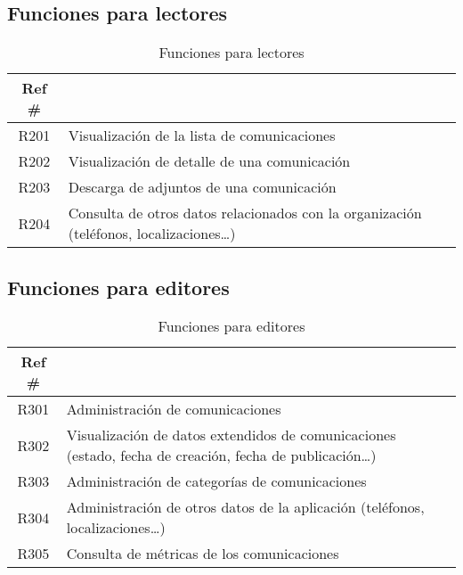 \subsection{Funciones para lectores}
\begin{table}[ht]
    \centering
    \begin{tabularx}{\textwidth}{|cX|}
    \rowcolor[HTML]{9B9B9B} 
    {\color[HTML]{FFFFFF} Ref \#} &
      \multicolumn{1}{l}{\cellcolor[HTML]{9B9B9B}{\color[HTML]{FFFFFF} Función}} \\ \hline
    R201\label{R201} & Visualización de la lista de comunicaciones \\
    R202\label{R202} & Visualización de detalle de una comunicación \\
    R203\label{R203} & Descarga de adjuntos de una comunicación \\ 
    R204\label{R204} & Consulta de otros datos relacionados con la organización (teléfonos, localizaciones\dots) \\
    \hline
    \end{tabularx}
    \caption{Funciones para lectores}
    \label{cuadro:funciones-lectores }
\end{table}


\subsection{Funciones para editores}

\begin{table}[ht]
    \centering
    \begin{tabularx}{\textwidth}{|cX|}
    \rowcolor[HTML]{9B9B9B} 
    {\color[HTML]{FFFFFF} Ref \#} &
      \multicolumn{1}{l}{\cellcolor[HTML]{9B9B9B}{\color[HTML]{FFFFFF} Función}} \\ \hline
    R301\label{R301} & Administración de comunicaciones \\
    R302\label{R302} & Visualización de datos extendidos de comunicaciones (estado, fecha de creación, fecha de publicación\dots) \\
    R303\label{R303} & Administración de categorías de comunicaciones \\
    R304\label{R304} & Administración de otros datos de la aplicación (teléfonos, localizaciones\dots) \\ 
    R305\label{R305} & Consulta de métricas de los comunicaciones \\ 
    \hline
    \end{tabularx}
    \caption{Funciones para editores}
    \label{cuadro:funciones-editores }
\end{table}

